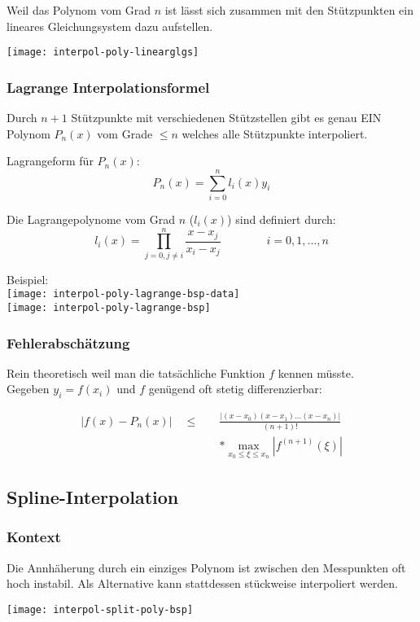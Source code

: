 Weil das Polynom vom Grad $n$ ist lässt sich zusammen mit den Stützpunkten
ein lineares Gleichungsystem dazu aufstellen.

\texttt{[image: interpol-poly-linearglgs]}


\subsubsection{Lagrange Interpolationsformel}

Durch $n+1$ Stützpunkte mit verschiedenen Stützstellen gibt es genau EIN Polynom
$P_n(x)$ vom Grade $\le n$ welches alle Stützpunkte interpoliert.

Lagrangeform für $P_n(x)$:
$$P_n(x) = \sum_{i=0}^n l_i(x) y_i$$

Die Lagrangepolynome vom Grad $n$ ($l_i(x)$) sind definiert durch:
$$l_i(x) = \prod_{j=0, j \ne i}^n \frac{x - x_j}{x_i - x_j} \qquad \qquad i = 0,1,...,n$$

Beispiel:\\
\texttt{[image: interpol-poly-lagrange-bsp-data]} \\
\texttt{[image: interpol-poly-lagrange-bsp]}


\subsubsection{Fehlerabschätzung}

Rein theoretisch weil man die tatsächliche Funktion $f$ kennen müsste.\\
Gegeben $y_i = f(x_i)$ und $f$ genügend oft stetig differenzierbar:

{
\Large
\begin{align*}
 |f(x) - P_n(x)| \quad \le \quad & \frac{|(x-x_0)(x-x_1)...(x-x_n)|}{(n+1)!}\\
                         & * \max_{x_0 \le \xi \le x_n} |f^{(n+1)}(\xi)|
\end{align*}
}



\subsection{Spline-Interpolation}

\subsubsection{Kontext}

Die Annhäherung durch ein einziges Polynom ist zwischen den Messpunkten oft
hoch instabil. Als Alternative kann stattdessen stückweise interpoliert werden.

\texttt{[image: interpol-split-poly-bsp]}


